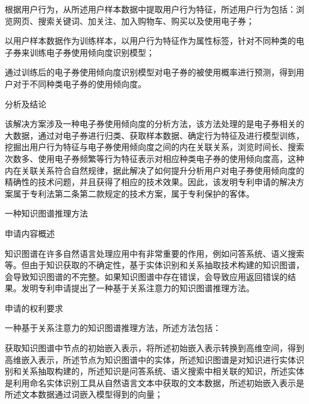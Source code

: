 {\setlength{\parindent}{20.6bp}根据用户行为，从所述用户样本数据中提取用户行为特征，所述用户行为包括：浏览网页、搜索关键词、加关注、加入购物车、购买以及使用电子券；\par}

{\setlength{\parindent}{20.6bp}以用户样本数据作为训练样本，以用户行为特征作为属性标签，针对不同种类的电子券来训练电子券使用倾向度识别模型；\par}

{\setlength{\parindent}{20.6bp}通过训练后的电子券使用倾向度识别模型对电子券的被使用概率进行预测，得到用户对于不同种类电子券的使用倾向度。\par}

{\setlength{\parindent}{20.1bp}分析及结论\par}

{\setlength{\parindent}{20.6bp}该解决方案涉及一种电子券使用倾向度的分析方法，该方法处理的是电子券相关的大数据，通过对电子券进行归类、获取样本数据、确定行为特征及进行模型训练，挖掘出用户行为特征与电子券使用倾向度之间的内在关联关系，浏览时间长、搜索次数多、使用电子券频繁等行为特征表示对相应种类电子券的使用倾向度高，这种内在关联关系符合自然规律，据此解决了如何提升分析用户对电子券使用倾向度的精确性的技术问题，并且获得了相应的技术效果。因此，该发明专利申请的解决方案属于专利法第二条第二款规定的技术方案，属于专利保护的客体。\par}

{\setlength{\parindent}{15.3bp}\par}

{\setlength{\parindent}{20.6bp}一种知识图谱推理方法\par}

{\setlength{\parindent}{20.1bp}申请内容概述\par}

{\setlength{\parindent}{20.6bp}知识图谱在许多自然语言处理应用中有非常重要的作用，例如问答系统、语义搜索等。但由于知识获取的不确定性，基于实体识别和关系抽取技术构建的知识图谱，会导致知识图谱的不完整。如果知识图谱中存在错误，会导致应用返回错误的结果。发明专利申请提出了一种基于关系注意力的知识图谱推理方法。\par}

{\setlength{\parindent}{20.1bp}申请的权利要求\par}

{\setlength{\parindent}{20.6bp}一种基于关系注意力的知识图谱推理方法，所述方法包括：\par}

{\setlength{\parindent}{20.6bp}获取知识图谱中节点的初始嵌入表示，将所述初始嵌入表示转换到高维空间，得到高维嵌入表示，所述节点为知识图谱中的实体，所述知识图谱是对知识进行实体识别和关系抽取构建的，所述知识是问答系统、语义搜索中相关联的知识，所述实体是利用命名实体识别工具从自然语言文本中获取的文本数据，所述初始嵌入表示是所述文本数据通过词嵌入模型得到的向量；\par}

